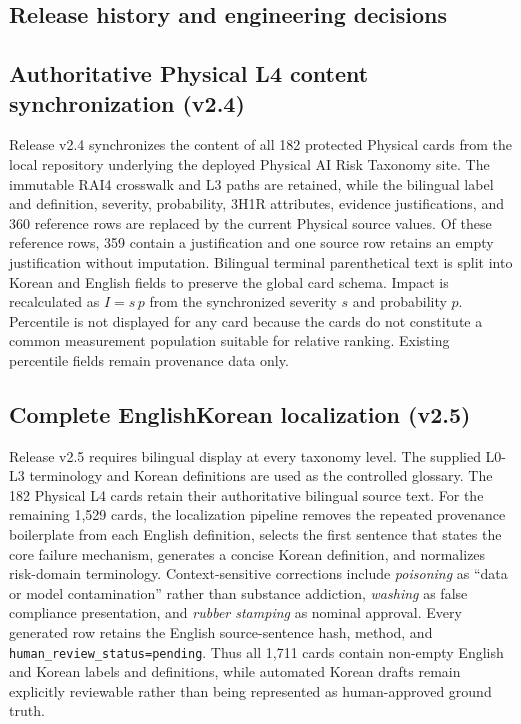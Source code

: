\documentclass[11pt,a4paper]{article}
\newcommand{\code}[1]{\texttt{#1}}
\begin{document}
\begin{appendices}

\section{Release history and engineering decisions}
\label{app:history}

\subsection{Authoritative Physical L4 content synchronization (v2.4)}

Release v2.4 synchronizes the content of all 182 protected Physical cards from
the local repository underlying the deployed Physical AI Risk Taxonomy site.
The immutable RAI4 crosswalk and L3 paths are retained, while the bilingual
label and definition, severity, probability, 3H1R attributes, evidence
justifications, and 360 reference rows are replaced by the current Physical
source values. Of these reference rows, 359 contain a justification and one
source row retains an empty justification without imputation. Bilingual
terminal parenthetical text is split into Korean and
English fields to preserve the global card schema. Impact is recalculated as
$I=s\,p$ from the synchronized severity $s$ and probability $p$. Percentile is
not displayed for any card because the cards do not constitute a common
measurement population suitable for relative ranking. Existing percentile
fields remain provenance data only.

\subsection{Complete English\textendash{}Korean localization (v2.5)}

Release v2.5 requires bilingual display at every taxonomy level. The supplied
L0-L3 terminology and Korean definitions are used as the controlled glossary.
The 182 Physical L4 cards retain their authoritative bilingual source text. For
the remaining 1,529 cards, the localization pipeline removes the repeated
provenance boilerplate from each English definition, selects the first sentence
that states the core failure mechanism, generates a concise Korean definition,
and normalizes risk-domain terminology. Context-sensitive corrections include
\textit{poisoning} as ``data or model contamination'' rather than substance
addiction, \textit{washing} as false compliance presentation, and
\textit{rubber stamping} as nominal approval. Every generated row retains the
English source-sentence hash, method, and \code{human\_review\_status=pending}.
Thus all 1,711 cards contain non-empty English and Korean labels and definitions,
while automated Korean drafts remain explicitly reviewable rather than being
represented as human-approved ground truth.


\end{appendices}
\end{document}
